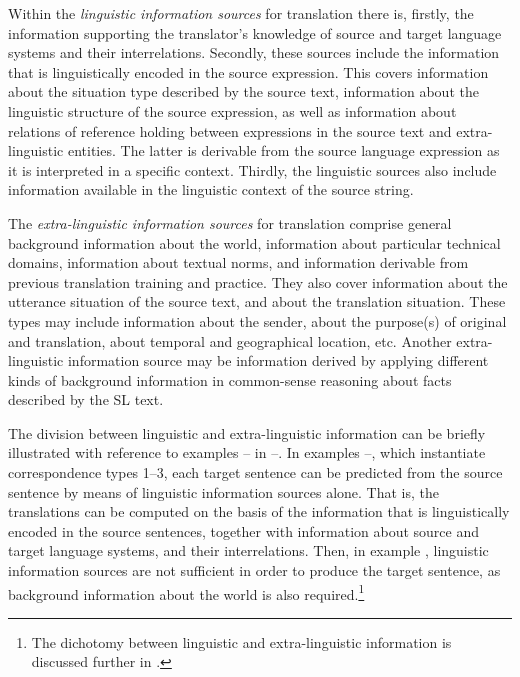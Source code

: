 \documentclass[output=paper]{LSP/langsci}
\begin{document}
Within the \textit{linguistic information sources} for translation there is, firstly, the information supporting the translator's knowledge of source and target language systems and their interrelations. Secondly, these sources include the information that is linguistically encoded in the source expression. This covers information about the situation type described by the source text, information about the linguistic structure of the source expression, as well as information about relations of reference holding between expressions in the source text and extra-linguistic entities. The latter is derivable from the source language expression as it is interpreted in a specific context. Thirdly, the linguistic sources also include information available in the linguistic context of the source string.

The \textit{extra-linguistic information sources} for translation comprise general background information about the world, information about particular technical domains, information about textual norms, and information derivable from previous translation training and practice. They also cover information about the utterance situation of the source text, and about the translation situation. These types may include information about the sender, about the purpose(s) of original and translation, about temporal and geographical location, etc. Another extra-linguistic information source may be information derived by applying different kinds of background information in common-sense reasoning about facts described by the SL text.

The division between linguistic and extra-linguistic information can be briefly illustrated with reference to examples -- in --. In examples --, which instantiate correspondence types 1--3, each target sentence can be predicted from the source sentence by means of linguistic information sources alone. That is, the translations can be computed on the basis of the information that is linguistically encoded in the source sentences, together with information about source and target language systems, and their interrelations. Then, in example , linguistic information sources are not sufficient in order to produce the target sentence, as background information about the world is also required.\footnote{The dichotomy between linguistic and extra-linguistic information is discussed further in \citet[90--102]{Thunes2011}.}
\end{document}
